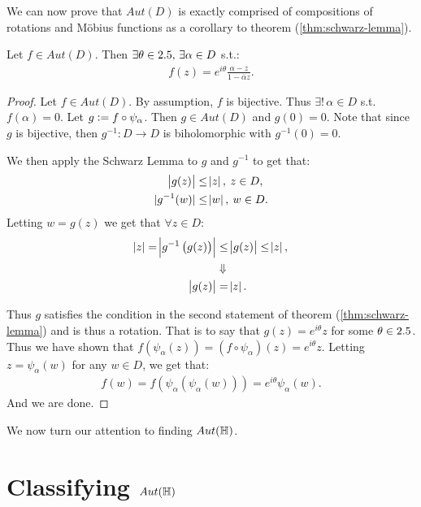 We can now prove that $Aut(D)$ is exactly comprised of compositions of rotations and M{\"o}bius functions as a corollary to theorem (\ref{thm:schwarz-lemma}).


\begin{corollary}\label{cor:aut-D-exist}
Let $f \in Aut(D)$. Then $\exists \theta \in 2.5, \, \exists \alpha \in D$ s.t.:
\begin{align*}
    f(z) = e^{i \theta} \frac{\alpha - z}{1 - \overline{\alpha } z}.
\end{align*}
\end{corollary}

\begin{proof}
Let $f \in Aut(D)$. By assumption, $f$ is bijective. Thus $\exists ! \, \alpha \in D$ s.t. $ f(\alpha) = 0$. Let $g \vcentcolon = f \circ \psi_\alpha$. Then $g \in Aut(D)$ and $g(0) = 0$. Note that since $g$ is bijective, then $g^{-1} : D \to D$ is biholomorphic with $g^{-1}(0) = 0$.

We then apply the Schwarz Lemma to $g$ and $g^{-1}$ to get that:
\begin{align*}
    \abs{g(z)} &\leq \abs{z}, \: z \in D,\\
    |g^{-1} ( w) | &\leq \abs{w}, \: w \in D.
\end{align*}
Letting $w = g(z)$ we get that $\forall z \in D$:
\begin{align*}
    \abs{z} = \abs{g^{-1} \left( g(z) \right)   } &\leq \abs{g(z)} \leq \abs{z},\\
    &\Downarrow\\
    \abs{g(z)} &= \abs{z}.
\end{align*}

Thus $g$ satisfies the condition in the second statement of theorem (\ref{thm:schwarz-lemma}) and is thus a rotation. That is to say that $g(z) = e^{i \theta} z $ for some $\theta \in 2.5$. Thus we have shown that $f \left( \psi_\alpha (z) \right) = \left( f \circ \psi_\alpha \right) (z) = e^{i \theta} z$. Letting $z = \psi_\alpha (w)$ for any $w \in D$, we get that:
\begin{align*}
   f(w) = f \left( \psi_\alpha \left( \psi_\alpha (w) \right) \right) = e^{i \theta} \psi_\alpha (w).
\end{align*}
And we are done.
\end{proof}




We now turn our attention to finding $Aut(\mathbb{H})$.

\section{Classifying $Aut(\mathbb{H})$}

